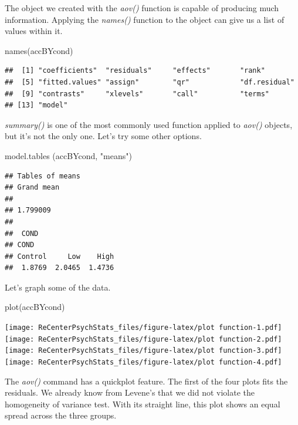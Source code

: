 \documentclass[
  english,
]{book}
\newenvironment{Shaded}{\begin{snugshade}}{\end{snugshade}}
\newcommand{\FunctionTok}[1]{\textcolor[rgb]{0.00,0.00,0.00}{#1}}
\newcommand{\NormalTok}[1]{#1}
\newcommand{\StringTok}[1]{\textcolor[rgb]{0.31,0.60,0.02}{#1}}
\begin{document}
The object we created with the \emph{aov()} function is capable of producing much information. Applying the \emph{names()} function to the object can give us a list of values within it.

\begin{Shaded}
\begin{Highlighting}[]
\FunctionTok{names}\NormalTok{(accBYcond)}
\end{Highlighting}
\end{Shaded}

\begin{verbatim}
##  [1] "coefficients"  "residuals"     "effects"       "rank"         
##  [5] "fitted.values" "assign"        "qr"            "df.residual"  
##  [9] "contrasts"     "xlevels"       "call"          "terms"        
## [13] "model"
\end{verbatim}

\emph{summary()} is one of the most commonly used function applied to \emph{aov()} objects, but it's not the only one.
Let's try some other options.

\begin{Shaded}
\begin{Highlighting}[]
\FunctionTok{model.tables}\NormalTok{ (accBYcond, }\StringTok{"means"}\NormalTok{)}
\end{Highlighting}
\end{Shaded}

\begin{verbatim}
## Tables of means
## Grand mean
##          
## 1.799009 
## 
##  COND 
## COND
## Control     Low    High 
##  1.8769  2.0465  1.4736
\end{verbatim}

Let's graph some of the data.

\begin{Shaded}
\begin{Highlighting}[]
\FunctionTok{plot}\NormalTok{(accBYcond) }
\end{Highlighting}
\end{Shaded}

\texttt{[image: ReCenterPsychStats\_files/figure-latex/plot function-1.pdf]} \texttt{[image: ReCenterPsychStats\_files/figure-latex/plot function-2.pdf]} \texttt{[image: ReCenterPsychStats\_files/figure-latex/plot function-3.pdf]} \texttt{[image: ReCenterPsychStats\_files/figure-latex/plot function-4.pdf]}

The \emph{aov()} command has a quickplot feature. The first of the four plots fits the residuals. We already know from Levene's that we did not violate the homogeneity of variance test. With its straight line, this plot shows an equal spread across the three groups.
\end{document}
